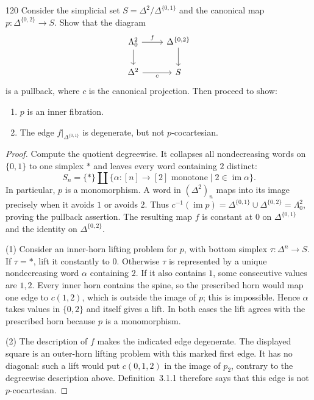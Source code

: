 \begin{exercise}{120}
Consider the simplicial set $S=\Delta^2/\Delta^{\{0,1\}}$ and the canonical map
$p\colon\allowbreak\Delta^{\{0,2\}}\to S$. Show that the diagram
\[
\begin{tikzcd}
 \Lambda^2_0 \arrow[r,"f"] \arrow[d] & \Delta^{\{0,2\}} \arrow[d] \\
 \Delta^2 \arrow[r,"c"'] & S
\end{tikzcd}
\]
is a pullback, where $c$ is the canonical projection. Then proceed to show:
\begin{enumerate}[label=(\arabic*)]
 \item $p$ is an inner fibration.
 \item The edge $f|_{\Delta^{\{0,1\}}}$ is degenerate, but not $p$-cocartesian.
\end{enumerate}

\begin{proof}
Compute the quotient degreewise. It collapses all nondecreasing words
on $\{0,1\}$ to one simplex $*$ and leaves every word containing $2$ distinct:
\[
 S_n=\{*\}\amalg\{\alpha\colon[n]\to[2]\text{ monotone}\mid
                         2\in\operatorname{im}\alpha\}.
\]
In particular, $p$ is a monomorphism.
A word in $(\Delta^2)_n$ maps into its image precisely when it avoids
$1$ or avoids $2$.
Thus $c^{-1}(\operatorname{im}p)=\Delta^{\{0,1\}}\cup\Delta^{\{0,2\}}
=\Lambda^2_0$, proving the pullback assertion.
The resulting map $f$ is constant at $0$ on $\Delta^{\{0,1\}}$
and the identity on $\Delta^{\{0,2\}}$.

(1) Consider an inner-horn lifting problem for $p$, with bottom simplex
$\tau\colon\Delta^n\to S$.
If $\tau=*$, lift it constantly to $0$.
Otherwise $\tau$ is represented by a unique nondecreasing word $\alpha$
containing $2$.
If it also contains $1$, some consecutive values are $1,2$.
Every inner horn contains the spine, so the prescribed horn would map
one edge to $c(1,2)$, which is outside the image of $p$; this is impossible.
Hence $\alpha$ takes values in $\{0,2\}$ and itself gives a lift.
In both cases the lift agrees with the prescribed horn because $p$ is a monomorphism.

(2) The description of $f$ makes the indicated edge degenerate.
The displayed square is an outer-horn lifting problem with this marked first edge.
It has no diagonal: such a lift would put $c(0,1,2)$ in the image of $p_2$,
contrary to the degreewise description above.
Definition~3.1.1 therefore says that this edge is not $p$-cocartesian.
\end{proof}
\end{exercise}
